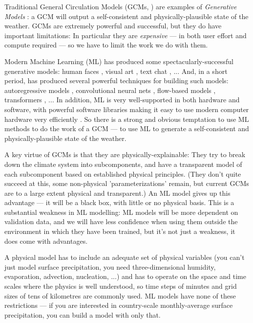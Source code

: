 \documentclass[gmd,manuscript]{copernicus}
\begin{document}
Traditional General Circulation Models (GCMs, \citet{phillips1956general}) are examples of {\em Generative Models} \citep{Generative}: a GCM will output a self-consistent and physically-plausible state of the weather. GCMs are extremely powerful and successful, but they do have important limitations: In particular they are {\em expensive} --- in both user effort and compute required --- so we have to limit the work we do with them.

Modern Machine Learning (ML) has produced some spectacularly-successful generative models: human faces \citep{StyleGAN2}, visual art \citep{Stable_Diffusion}, text chat \citep{ChatGPT}, ... And, in a short period, has produced several powerful techniques for building such models: autoregressive models \citep{oord2016pixel}, convolutional neural nets \citep{LeNet}, flow-based models \citep{dinh2017density}, transformers \citep{vaswani2017attention}, ... In addition, ML is very well-supported in both hardware and software, with powerful software libraries making it easy to use modern computer hardware very efficiently \citep{tensorflow2015-whitepaper}. So there is a strong and obvious temptation to use ML methods to do the work of a GCM --- to use ML to generate a self-consistent and physically-plausible state of the weather.

A key virtue of GCMs is that they are physically-explainable: They try to break down the climate system into subcomponents, and have a transparent model of each subcomponent based on established physical principles. (They don't quite succeed at this, some non-physical 'parameterizations' remain, but current GCMs are to a large extent physical and transparent.) An ML model gives up this advantage --- it will be a black box, with little or no physical basis. This is a substantial weakness in ML modelling: ML models will be more dependent on validation data, and we will have less confidence when using them outside the environment in which they have been trained, but it's not just a weakness, it does come with advantages.

A physical model has to include an adequate set of physical variables (you can't just model surface precipitation, you need three-dimensional humidity, evaporation, advection, nucleation, ...) and has to operate on the space and time scales where the physics is well understood, so time steps of minutes and grid sizes of tens of kilometres are commonly used. ML models have none of these restrictions --- if you are interested in country-scale monthly-average surface precipitation, you can build a model with only that.
\end{document}
